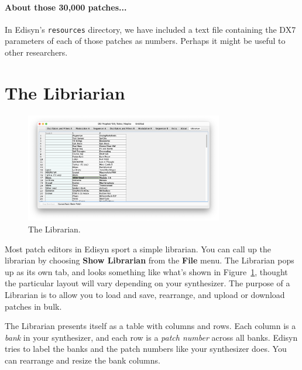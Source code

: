 \documentclass{article}
\begin{document}
\paragraph{About those 30,000 patches...} In Edisyn's \texttt{resources} directory, we have included a text file containing the DX7 parameters of each of those patches as numbers. Perhaps it might be useful to other researchers. 

\section{The Libriarian}
\label{librarian}

\begin{figure}
\vspace{-2em}\includegraphics[width=3.4in]{Librarian.png}
\vspace{-3em}
\caption{The Librarian.}
\vspace{-1em}
\label{librarianpanel}
\end{figure}


Most patch editors in Edisyn sport a simple librarian.  You can call up the librarian by choosing {\bf Show Librarian} from the {\bf File} menu.  The Librarian pops up as its own tab, and looks something like what's shown in Figure~\ref{librarianpanel}, thought the particular layout will vary depending on your synthesizer. The purpose of a Librarian is to allow you to load and save, rearrange, and upload or download patches in bulk.  %

The Librarian presents itself as a table with columns and rows.  Each column is a {\it bank} in your synthesizer, and each row is a {\it patch number} across all banks.  Edisyn tries to label the banks and the patch numbers like your synthesizer does.  You can rearrange and resize the bank columns.  
\end{document}
